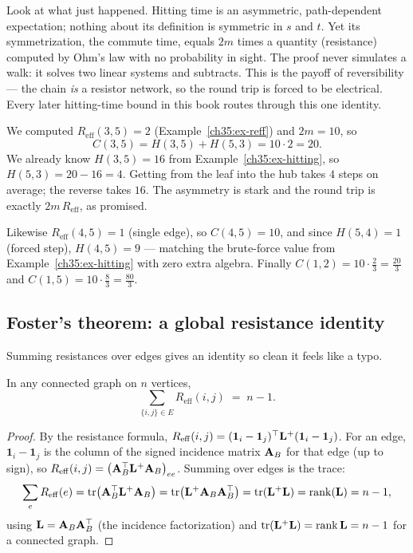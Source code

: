\begin{aestheticbox}
Look at what just happened. Hitting time is an asymmetric, path-dependent expectation; nothing about its definition is symmetric in $s$ and $t$. Yet its symmetrization, the commute time, equals $2m$ times a quantity (resistance) computed by Ohm's law with no probability in sight. The proof never simulates a walk: it solves two linear systems and subtracts. This is the payoff of reversibility --- the chain \emph{is} a resistor network, so the round trip is forced to be electrical. Every later hitting-time bound in this book routes through this one identity.
\end{aestheticbox}

\begin{example}\label{ch35:ex-commute}
We computed $R_{\mathrm{eff}}(3,5)=2$ (Example~\ref{ch35:ex-reff}) and $2m=10$, so
\[
  C(3,5)=H(3,5)+H(5,3)=10\cdot 2=20.
\]
We already know $H(3,5)=16$ from Example~\ref{ch35:ex-hitting}, so $H(5,3)=20-16=4$. Getting from the leaf into the hub takes $4$ steps on average; the reverse takes $16$. The asymmetry is stark and the round trip is exactly $2m\,R_{\mathrm{eff}}$, as promised.

Likewise $R_{\mathrm{eff}}(4,5)=1$ (single edge), so $C(4,5)=10$, and since $H(5,4)=1$ (forced step), $H(4,5)=9$ --- matching the brute-force value from Example~\ref{ch35:ex-hitting} with zero extra algebra. Finally $C(1,2)=10\cdot\tfrac23=\tfrac{20}{3}$ and $C(1,5)=10\cdot\tfrac83=\tfrac{80}{3}$.
\end{example}

\subsection{Foster's theorem: a global resistance identity}

Summing resistances over edges gives an identity so clean it feels like a typo.

\begin{theorem}[Foster]\label{ch35:thm-foster}
In any connected graph on $n$ vertices,
\[
  \sum_{\{i,j\}\in E} R_{\mathrm{eff}}(i,j)\;=\;n-1.
\]
\end{theorem}

\begin{proof}
By the resistance formula, $R_{\mathrm{eff}}(i,j)=(\mathbf{1}_i-\mathbf{1}_j)^\top\mathbf{L}^+(\mathbf{1}_i-\mathbf{1}_j)$. For an edge, $\mathbf{1}_i-\mathbf{1}_j$ is the column of the signed incidence matrix $\mathbf{A}_B$ for that edge (up to sign), so $R_{\mathrm{eff}}(i,j)=\big(\mathbf{A}_B^\top\mathbf{L}^+\mathbf{A}_B\big)_{ee}$. Summing over edges is the trace:
\[
  \sum_e R_{\mathrm{eff}}(e)=\mathrm{tr}\big(\mathbf{A}_B^\top\mathbf{L}^+\mathbf{A}_B\big)
  =\mathrm{tr}\big(\mathbf{L}^+\mathbf{A}_B\mathbf{A}_B^\top\big)
  =\mathrm{tr}(\mathbf{L}^+\mathbf{L})
  =\operatorname{rank}(\mathbf{L})=n-1,
\]
using $\mathbf{L}=\mathbf{A}_B\mathbf{A}_B^\top$ (the incidence factorization) and $\mathrm{tr}(\mathbf{L}^+\mathbf{L})=\operatorname{rank}\mathbf{L}=n-1$ for a connected graph.
\end{proof}

